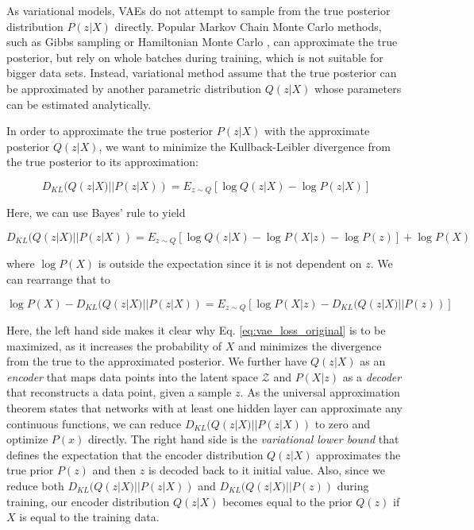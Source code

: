 \documentclass[6pt]{article}
\begin{document}
As variational models, VAEs do not attempt to sample from the true posterior distribution $P(z|X)$ directly. Popular Markov Chain Monte Carlo methods, such as Gibbs sampling \citep{geman1984stochastic} or Hamiltonian Monte Carlo \citep{duane1987hybrid}, can approximate the true posterior, but rely on whole batches during training, which is not suitable for bigger data sets. Instead, variational method assume that the true posterior can be approximated by another parametric distribution $Q(z|X)$ whose parameters can be estimated analytically. 

In order to approximate the true posterior  $P(z|X)$ with the approximate posterior $Q(z|X)$, we want to minimize the Kullback-Leibler divergence from the true posterior to its approximation: 

\begin{equation}
D_{KL}(Q(z|X)||P(z|X)) = E_{z\sim Q}[\log Q(z|X) - \log P(z|X)]
\end{equation}

Here, we can use Bayes' rule to yield 

\begin{equation}
D_{KL}(Q(z|X)||P(z|X)) = E_{z\sim Q}[\log Q(z|X) - \log P(X|z)-\log P(z)] + \log P(X)
\end{equation}

\noindent where $\log P(X)$ is outside the expectation since it is not dependent on $z$. We can rearrange that to 

\begin{equation}
\label{eq:vae_loss_original}
\log P(X) - D_{KL}(Q(z|X)||P(z|X)) = E_{z\sim Q}[\log P(X|z) - D_{KL}(Q(z|X)||P(z))] 
\end{equation}



Here, the left hand side makes it clear why Eq. \ref{eq:vae_loss_original} is to be maximized, as it increases the probability of $X$ and minimizes the divergence from the true to the approximated posterior. We further have $Q(z|X)$ as an \textit{encoder} that maps data points into the latent space $\mathcal{Z}$ and $P(X|z)$ as a \textit{decoder} that reconstructs a data point, given a sample $z$. As the universal approximation theorem states that networks with at least one hidden layer can approximate any continuous functions, we can reduce $D_{KL}(Q(z|X)||P(z|X))$ to zero and optimize $P(x)$ directly. The right hand side is the \textit{variational lower bound} that defines the expectation that the encoder distribution $Q(z|X)$ approximates the true prior $P(z)$ and then $z$ is decoded back to it initial value. Also, since we reduce both $D_{KL}(Q(z|X)||P(z|X))$ and $D_{KL}(Q(z|X)||P(z))$ during training, our encoder distribution $Q(z|X)$ becomes equal to the prior $Q(z)$  if $X$ is equal to the training data.
\end{document}
